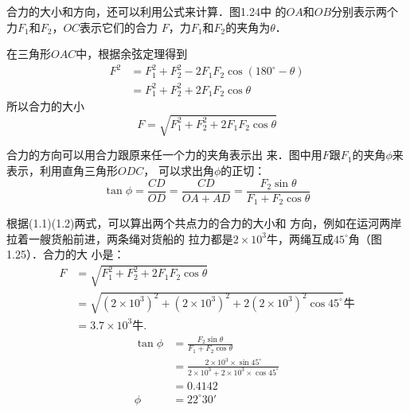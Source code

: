     合力的大小和方向，还可以利用公式来计算．图1.24中
的$OA$和$OB$分别表示两个力$F_1$和$F_2$，$OC$表示它们的合力
$F$，力$F_1$和$F_2$的夹角为$\theta$．

\begin{figure}[htp]
\centering
{}
\caption{}
\end{figure}


    在三角形$OAC$中，根据余弦定理得到
\[\begin{split}
F^2 & = F_1^2+F_2^2-2F_1F_2\cos(180^\circ -\theta)  \\
&= F_1^2+F_2^2+2F_1F_2\cos\theta
\end{split} \]
所以合力的大小
\begin{equation}
F=\sqrt{F_1^2+F_2^2+2F_1F_2\cos\theta}
\end{equation}

    合力的方向可以用合力跟原来任一个力的夹角表示出
来．图中用$F$跟$F_1$的夹角$\phi$来表示，利用直角三角形$ODC$，
可以求出角$\phi$的正切：
\begin{equation}
\tan\phi =\frac{CD}{OD}=\frac{CD}{OA+AD}=\frac{F_2\sin\theta }{F_1+F_2\cos\theta}
\end{equation}




    根据(1.1)(1.2)两式，可以算出两个共点力的合力的大小和
方向，例如在运河两岸拉着一艘货船前进，两条绳对货船的
拉力都是$2\times 10^3$牛，两绳互成$45^\circ$角（图1.25）．合力的大
小是：
\[\begin{split}
F&= \sqrt{F_1^2+F_2^2+2F_1F_2\cos\theta}\\
&=\sqrt{(2\times 10^3)^2+(2\times 10^3)^2+2(2\times 10^3)^2\cos 45^{\circ}}\text{牛}\\
&=3.7\times 10^3\text{牛.}
\end{split} \]
\[\begin{split}
\tan\phi&= \frac{F_2\sin\theta }{F_1+F_2\cos\theta}\\
&= \frac{2\times 10^3\times \sin 45^{\circ}}{2\times 10^3+2\times 10^3\times \cos 45^{\circ}}  \\
&=0.4142\\
\phi &= 22^{\circ} 30'
\end{split} \]

